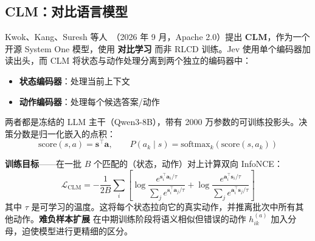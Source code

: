 \subsection{CLM：对比语言模型}
\label{subsec:clm}

Kwok、Kang、Suresh 等人~\cite{kwok2026clm}（2026 年 9 月，Apache 2.0）提出 \textbf{CLM}，作为一个开源 System One 模型，使用 \textbf{对比学习} 而非 RLCD 训练。Jev 使用单个编码器加读出头，而 CLM 将状态与动作处理分离到两个独立的编码器中：

\begin{itemize}
  \item \textbf{状态编码器}：处理当前上下文
  \item \textbf{动作编码器}：处理每个候选答案/动作
\end{itemize}

两者都是冻结的 LLM 主干（Qwen3-8B），带有 2000 万参数的可训练投影头。决策分数是归一化嵌入的点积：
\begin{equation}
\mathrm{score}(s, a) = \mathbf{s}^\top \mathbf{a}, \qquad P(a_k \mid s) = \mathrm{softmax}_k(\mathrm{score}(s, a_k))
\end{equation}

\textbf{训练目标}——在一批 $B$ 个匹配的（状态，动作）对上计算双向 InfoNCE：
\begin{equation}
\mathcal{L}_{\mathrm{CLM}} = -\frac{1}{2B}\sum_i \left[ \log \frac{e^{\mathbf{s}_i^\top \mathbf{a}_i / \tau}}{\sum_j e^{\mathbf{s}_i^\top \mathbf{a}_j / \tau}} + \log \frac{e^{\mathbf{a}_i^\top \mathbf{s}_i / \tau}}{\sum_j e^{\mathbf{a}_i^\top \mathbf{s}_j / \tau}} \right]
\end{equation}
其中 $\tau$ 是可学习的温度。这将每个状态拉向它的真实动作，并推离批次中所有其他动作。\textbf{难负样本扩展} 在中期训练阶段将语义相似但错误的动作 $h_{ik}^{(a)}$ 加入分母，迫使模型进行更精细的区分。

